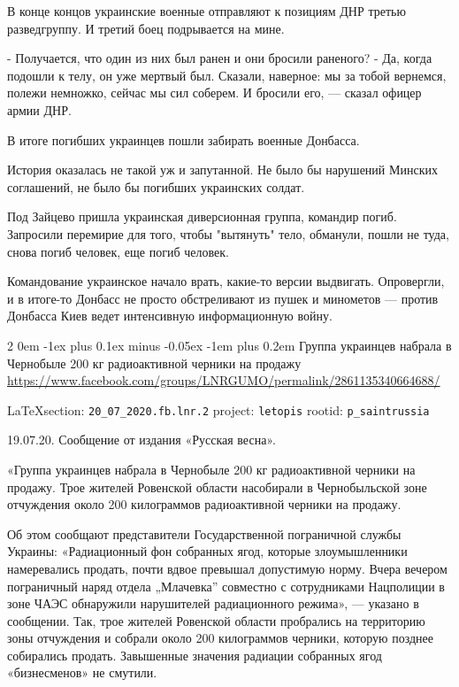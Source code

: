 \documentclass[a4paper,11pt]{extreport}
\makeatletter
\renewcommand\subsection{%
  \clearpage
    \@startsection{subsection}%
    {2}%
    {0em}%
    {-1ex plus 0.1ex minus -0.05ex}%
    {-1em plus 0.2em}%
    {\scshape\bfseries\Large}%
}
\makeatother
\begin{document}
В конце концов украинские военные отправляют к позициям ДНР третью
разведгруппу. И третий боец подрывается на мине.

- Получается, что один из них был ранен и они бросили раненого?  - Да, когда
подошли к телу, он уже мертвый был. Сказали, наверное: мы за тобой вернемся,
полежи немножко, сейчас мы сил соберем. И бросили его, --- сказал офицер армии
ДНР.

В итоге погибших украинцев пошли забирать военные Донбасса.

История оказалась не такой уж и запутанной. Не было бы нарушений Минских
соглашений, не было бы погибших украинских солдат.

Под Зайцево пришла украинская диверсионная группа, командир погиб. Запросили
перемирие для того, чтобы "вытянуть" тело, обманули, пошли не туда, снова погиб
человек, еще погиб человек. 

Командование украинское начало врать, какие-то версии выдвигать. Опровергли, и
в итоге-то Донбасс не просто обстреливают из пушек и минометов --- против
Донбасса Киев ведет интенсивную информационную войну.
  
 
 
\subsection{Группа украинцев набрала в Чернобыле 200 кг радиоактивной черники на продажу}
\label{sec:20_07_2020.fb.lnr.2}
\url{https://www.facebook.com/groups/LNRGUMO/permalink/2861135340664688/}
  
\vspace{0.5cm}
{\small\LaTeX section: \verb|20_07_2020.fb.lnr.2| project: \verb|letopis| rootid: \verb|p_saintrussia|}
\vspace{0.5cm}
  
19.07.20. Сообщение от издания «Русская весна».

«Группа украинцев набрала в Чернобыле 200 кг радиоактивной черники на продажу.
Трое жителей Ровенской области насобирали в Чернобыльской зоне отчуждения около
200 килограммов радиоактивной черники на продажу.

Об этом сообщают представители Государственной пограничной службы Украины:
«Радиационный фон собранных ягод, которые злоумышленники намеревались продать,
почти вдвое превышал допустимую норму.  Вчера вечером пограничный наряд отдела
„Млачевка” совместно с сотрудниками Нацполиции в зоне ЧАЭС обнаружили
нарушителей радиационного режима», --- указано в сообщении.  Так, трое жителей
Ровенской области пробрались на территорию зоны отчуждения и собрали около 200
килограммов черники, которую позднее собирались продать.  Завышенные значения
радиации собранных ягод «бизнесменов» не смутили.
\end{document}
